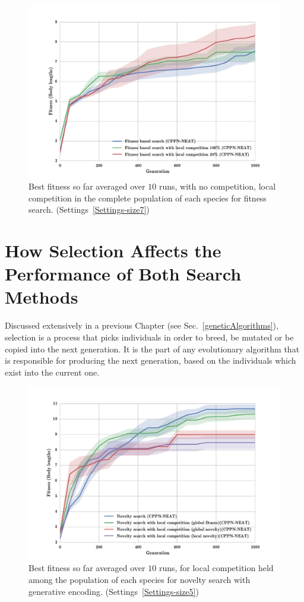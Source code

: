 \begin{figure}[t!]
\centering
\includegraphics[width=1.0\textwidth]{../Figures/Results/fitComp100_20percent.pdf}
\caption{Best fitness so far averaged over $10$ runs, with no competition, local competition in the complete population of each species for fitness search. (Settings~\ref{Settings-size7})}
\label{fig:fitComp100_20percent}
\end{figure}

\section{How Selection Affects the Performance of Both Search Methods}

Discussed extensively in a previous Chapter (see Sec.~\ref{geneticAlgorithms}), selection is a process that picks individuals in order to breed, be mutated or be copied into the next generation. It is the part of any evolutionary algorithm that is responsible for producing the next generation, based on the individuals which exist into the current one.


\begin{figure}[t!]
\centering
\includegraphics[width=1.0\textwidth]{../Figures/Results/NoveltyCompetitionsSize5.pdf}
\caption{Best fitness so far averaged over $10$ runs, for local competition held among the population of each species for novelty search with generative encoding. (Settings~\ref{Settings-size5})}
\label{fig:NoveltyCompetitionsSize5}
\end{figure}


